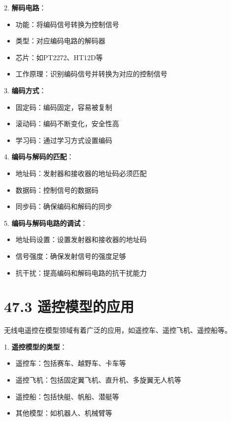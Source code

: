 \documentclass[12pt,UTF8]{ctexbook}
\begin{document}
2. \textbf{解码电路}：
   \begin{itemize}[leftmargin=3.5em]
   \item 功能：将编码信号转换为控制信号
   \item 类型：对应编码电路的解码器
   \item 芯片：如PT2272、HT12D等
   \item 工作原理：识别编码信号并转换为对应的控制信号
   \end{itemize}

3. \textbf{编码方式}：
   \begin{itemize}[leftmargin=3.5em]
   \item 固定码：编码固定，容易被复制
   \item 滚动码：编码不断变化，安全性高
   \item 学习码：通过学习方式设置编码
   \end{itemize}

4. \textbf{编码与解码的匹配}：
   \begin{itemize}[leftmargin=3.5em]
   \item 地址码：发射器和接收器的地址码必须匹配
   \item 数据码：控制信号的数据码
   \item 同步码：确保编码和解码的同步
   \end{itemize}

5. \textbf{编码与解码电路的调试}：
   \begin{itemize}[leftmargin=3.5em]
   \item 地址码设置：设置发射器和接收器的地址码
   \item 信号强度：确保发射信号的强度足够
   \item 抗干扰：提高编码和解码电路的抗干扰能力
   \end{itemize}

\section*{47.3 遥控模型的应用}

无线电遥控在模型领域有着广泛的应用，如遥控车、遥控飞机、遥控船等。

1. \textbf{遥控模型的类型}：
   \begin{itemize}[leftmargin=3.5em]
   \item 遥控车：包括赛车、越野车、卡车等
   \item 遥控飞机：包括固定翼飞机、直升机、多旋翼无人机等
   \item 遥控船：包括快艇、帆船、潜艇等
   \item 其他模型：如机器人、机械臂等
   \end{itemize}
\end{document}
